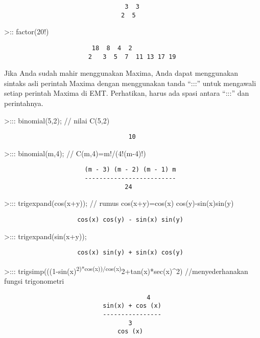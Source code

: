\documentclass[
]{book}
\begin{document}
\begin{verbatim}
                                 3  3
                                2  5
\end{verbatim}

\textgreater:: factor(20!)

\begin{verbatim}
                        18  8  4  2
                       2   3  5  7  11 13 17 19
\end{verbatim}

Jika Anda sudah mahir menggunakan Maxima, Anda dapat menggunakan sintaks asli perintah Maxima dengan menggunakan tanda ``:::'' untuk mengawali setiap perintah Maxima di EMT. Perhatikan, harus ada spasi antara ``:::'' dan perintahnya.

\textgreater::: binomial(5,2); // nilai C(5,2)

\begin{verbatim}
                                  10
\end{verbatim}

\textgreater::: binomial(m,4); // C(m,4)=m!/(4!(m-4)!)

\begin{verbatim}
                      (m - 3) (m - 2) (m - 1) m
                      -------------------------
                                 24
\end{verbatim}

\textgreater::: trigexpand(cos(x+y)); // rumus cos(x+y)=cos(x) cos(y)-sin(x)sin(y)

\begin{verbatim}
                    cos(x) cos(y) - sin(x) sin(y)
\end{verbatim}

\textgreater::: trigexpand(sin(x+y));

\begin{verbatim}
                    cos(x) sin(y) + sin(x) cos(y)
\end{verbatim}

\textgreater::: trigsimp(((1-sin(x)\textsuperscript{2)*cos(x))/cos(x)}2+tan(x)*sec(x)\^{}2) //menyederhanakan fungsi trigonometri

\begin{verbatim}
                                       4
                           sin(x) + cos (x)
                           ----------------
                                  3
                               cos (x)
\end{verbatim}
\end{document}
